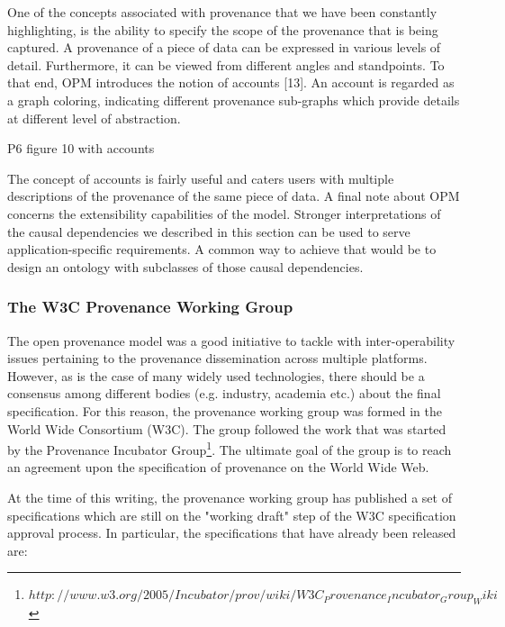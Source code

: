 One of the concepts associated with provenance that we have been constantly highlighting, is the ability to specify the scope of the provenance that is being captured.  A provenance of a piece of data can be expressed in various levels of detail. Furthermore, it can be viewed from different angles and standpoints. To that end, OPM introduces the notion of accounts [13]. An account is regarded as a graph coloring, indicating different provenance sub-graphs which provide details at different level of abstraction.

P6 figure 10 with accounts

The concept of accounts is fairly useful and caters users with multiple descriptions of the provenance of the same piece of data.
A final note about OPM concerns the extensibility capabilities of the model. Stronger interpretations of the causal dependencies we described in this section can be used to serve application-specific requirements. A common way to achieve that would be to design an ontology with subclasses of those causal dependencies.


\subsubsection{The W3C Provenance Working Group}
The open provenance model was a good initiative to tackle with inter-operability issues pertaining to the provenance dissemination across multiple platforms. However, as is the case of many widely used technologies, there should be a consensus among different bodies (e.g. industry, academia etc.) about the final specification. For this reason, the provenance working group was formed in the World Wide Consortium (W3C). The group followed the work that was started by the Provenance Incubator Group\footnote{$http://www.w3.org/2005/Incubator/prov/wiki/W3C_Provenance_Incubator_Group_Wiki$}. The ultimate goal of the group is to reach an agreement upon the specification of provenance on the World Wide Web.

At the time of this writing, the provenance working group has published a set of specifications which are still on the "working draft" step of the W3C specification approval process. In particular, the specifications that have already been released are:

